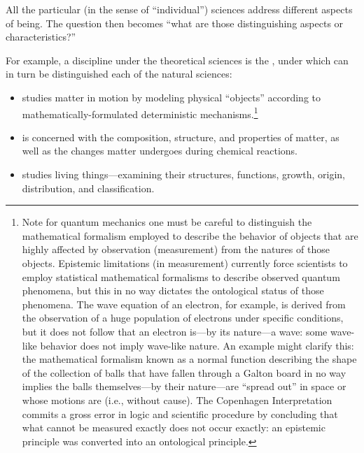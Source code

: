 All the particular (in the sense of ``individual'') sciences address different aspects of being. The question then becomes ``what are those  distinguishing aspects or characteristics?''

For example, a discipline under the theoretical sciences is the , under which can in turn be distinguished each of the natural sciences:


\begin{itemize}
\item {} studies matter in motion by modeling physical ``objects'' according to mathematically-formulated deterministic mechanisms.\footnote{Note for quantum mechanics one must be careful to distinguish the mathematical formalism employed to describe the behavior of objects that are highly affected by observation (measurement) from the natures of those objects. Epistemic limitations (in measurement) currently force scientists to employ statistical mathematical formalisms to describe observed quantum phenomena, but this in no way dictates the ontological status of those phenomena. The wave equation of an electron, for example, is derived from the observation of a huge population of electrons under specific conditions, but it does not follow that an electron is---by its nature---a wave: some wave-like behavior does not imply wave-like nature. An example might clarify this: the mathematical formalism known as a normal function describing the shape of the collection of balls that have fallen through a Galton board in no way implies the balls themselves---by their nature---are ``spread out'' in space or whose motions are  (i.e., without cause). The Copenhagen Interpretation commits a gross error in logic and scientific procedure by concluding that what cannot be measured exactly does not occur exactly: an epistemic principle was converted into an ontological principle.}
\item {} is concerned with the composition, structure, and properties of matter, as well as the changes matter undergoes during chemical reactions.
\item {} studies living things---examining their structures, functions, growth, origin, distribution, and classification.
\end{itemize}

